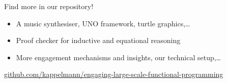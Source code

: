 \documentclass{beamer}
\begin{document}




\begin{frame}
\centerline{\alert{\huge{Find more in our repository!}}}
\begin{itemize}
\item A music synthesiser, UNO framework, turtle graphics,\dots
\item Proof checker for inductive and equational reasoning
\item More engagement mechanisms and insights, our technical setup,\dots
\end{itemize}

\vspace{\baselineskip}
\centerline{\small\url{github.com/kappelmann/engaging-large-scale-functional-programming}}
\end{frame}
\end{document}
